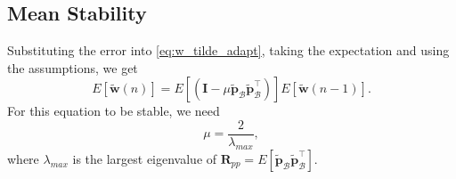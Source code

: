 \subsection{Mean Stability}
Substituting the error into \eqref{eq:w_tilde_adapt}, taking the expectation and using the assumptions, we get
\begin{equation}
    E\left[\tilde{\mathbf{w}}(n)\right] = E\left[ \left(\mathbf{I} - \mu \tilde{\mathbf{p}}_{\mathcal{B}}\tilde{\mathbf{p}}^\top_{\mathcal{B}} \right) \right] E\left[\tilde{\mathbf{w}}(n-1)\right].
\end{equation}
For this equation to be stable, we need
\begin{equation}
    \mu = \frac{2}{\lambda_{max}},
\end{equation}
where $\lambda_{max}$ is the largest eigenvalue of $\mathbf{R}_{pp} = E\left[ \tilde{\mathbf{p}}_{\mathcal{B}}\tilde{\mathbf{p}}^\top_{\mathcal{B}} \right]$.

